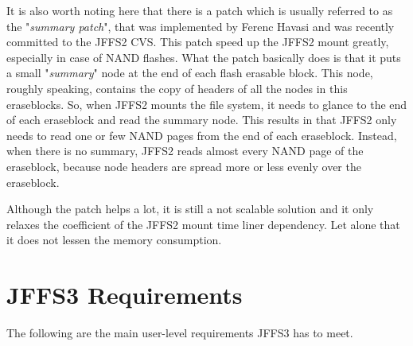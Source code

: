 \documentclass[12pt,a4paper,oneside,titlepage]{article}
\begin{document}
It is also worth noting here that there is a patch which is usually referred to
as the "\emph{summary patch}", that was implemented by Ferenc Havasi and was
recently committed to the JFFS2 CVS. This patch speed up the JFFS2 mount
greatly, especially in case of NAND flashes. What the patch basically does is
that it puts a small "\emph{summary}" node at the end of each flash erasable
block. This node, roughly speaking, contains the copy of headers of all the
nodes in this eraseblocks. So, when JFFS2 mounts the file system, it needs to
glance to the end of each eraseblock and read the summary node. This results in
that JFFS2 only needs to read one or few NAND pages from the end of each
eraseblock.  Instead, when there is no summary, JFFS2 reads almost every NAND
page of the eraseblock, because node headers are spread more or less evenly
over the eraseblock.

Although the patch helps a lot, it is still a not scalable solution and it only
relaxes the coefficient of the JFFS2 mount time liner dependency. Let alone
that it does not lessen the memory consumption.

%
%
\section{JFFS3 Requirements} \label{ref_SectionJFFS3Req}

The following are the main \mbox{user-level} requirements JFFS3 has to meet.
\end{document}
